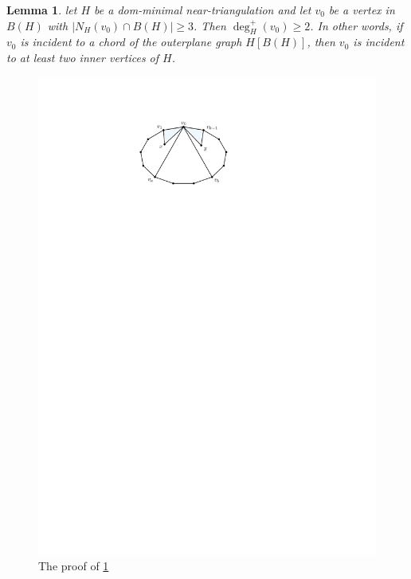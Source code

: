 \documentclass[a4paper,UKenglish,cleveref, autoref, thm-restate]{lipics-v2021}
\newtheorem{lem}{Lemma}
\begin{document}
\begin{lem}\label{chord_incident}
  let $H$ be a dom-minimal near-triangulation and let $v_0$ be a vertex in $B(H)$ with $|N_H(v_0)\cap B(H)|\ge 3$.  Then $\deg^+_H(v_0)\ge 2$.  In other words, if $v_0$ is incident to a chord of the outerplane graph $H[B(H)]$, then $v_0$ is incident to at least two inner vertices of $H$.
\end{lem}

\begin{figure}[htbp]
  \centering
  \includegraphics{figs/chord_incident}
  \caption{The proof of \cref{chord_incident}}
  \label{chord_incident_fig}
\end{figure}
\end{document}
